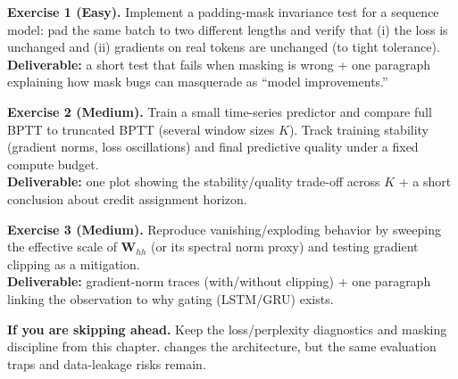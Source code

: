\begin{tcolorbox}[summarybox, title={Exercises}]
\textbf{Exercise 1 (Easy).} Implement a padding-mask invariance test for a sequence model: pad the same batch to two different lengths and verify that (i) the loss is unchanged and (ii) gradients on real tokens are unchanged (to tight tolerance). \\
\textbf{Deliverable:} a short test that fails when masking is wrong + one paragraph explaining how mask bugs can masquerade as ``model improvements.''

\smallskip
\textbf{Exercise 2 (Medium).} Train a small time-series predictor and compare full BPTT to truncated BPTT (several window sizes \(K\)). Track training stability (gradient norms, loss oscillations) and final predictive quality under a fixed compute budget. \\
\textbf{Deliverable:} one plot showing the stability/quality trade-off across \(K\) + a short conclusion about credit assignment horizon.

\smallskip
\textbf{Exercise 3 (Medium).} Reproduce vanishing/exploding behavior by sweeping the effective scale of \(\mathbf{W}_{hh}\) (or its spectral norm proxy) and testing gradient clipping as a mitigation. \\
\textbf{Deliverable:} gradient-norm traces (with/without clipping) + one paragraph linking the observation to why gating (LSTM/GRU) exists.

\par\medskip
\noindent\textbf{If you are skipping ahead.} Keep the loss/perplexity diagnostics and masking discipline from this chapter.  changes the architecture, but the same evaluation traps and data-leakage risks remain.
\end{tcolorbox}

